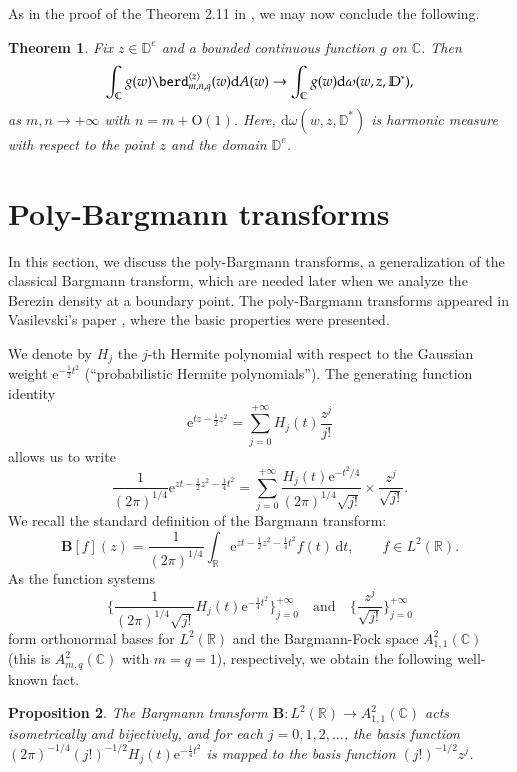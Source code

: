 \documentclass{birkart}
\newtheorem{thm}{Theorem}[section]
\newtheorem{prop}[thm]{Proposition}
\theoremstyle{definition}
\theoremstyle{remark}
\numberwithin{equation}{section}
\numberwithin{figure}{section}
\newcommand{\e}{\mathrm e}
\newcommand{\1}{{\mathbf 1}}
\newcommand{\Rpar}{q}
\newcommand{\C}{{\mathbb C}}
\newcommand{\D}{{\mathbb D}}
\newcommand{\R}{{\mathbb R}}
\newcommand{\Ordo}{\mathrm{O}}
\newcommand{\Bop}{{\mathbf B}}
\newcommand{\diff}{{\mathrm d}}
\begin{document}
As in the proof of the Theorem 2.11 in \cite{ahm1}, we may now conclude
the following. 
  
\begin{thm}
Fix $z\in\D^e$ and a bounded continuous function $g$ on $\mathbb{C}$. Then 
\[ 
\int_{\C}g(w)\berd^{\langle z\rangle}_{m,n,\Rpar}(w)\diff A(w)\to\int_{\C}g(w)
\diff\omega(w,z, \mathbb{D}^*) , 
\] 
as $m,n \to+\infty$ with $n=m+\Ordo(1)$. Here, 
$ \diff\omega(w,z, \mathbb{D}^*) $ is harmonic measure with respect to the 
point $z$ and the domain $\D^e$.
\end{thm}


\section{Poly-Bargmann transforms}

In this section, we discuss the poly-Bargmann transforms, a generalization of
the classical Bargmann transform, which are needed later when we analyze 
the Berezin density at a boundary point. The poly-Bargmann transforms appeared
in Vasilevski's paper \cite{vas}, where the basic properties were presented. 
\medskip

We denote by $H_j$ the $j$-th Hermite polynomial with respect to the Gaussian 
weight $\e^{-\frac12t^2}$ (``probabilistic Hermite polynomials''). The 
generating function identity
\[ 
\e^{tz-\frac12z^2} = \sum_{j=0}^{+\infty} H_j(t)\frac{z^j}{j!}
\]
allows us to write
\[
\frac{1}{(2\pi)^{1/4}}\e^{zt-\frac12z^2-\frac14t^2}=  
\sum_{j=0}^{+\infty} \frac{H_j(t)\e^{-t^2/4}}{(2\pi)^{1/4}\sqrt{j!}}
\times\frac{z^j}{\sqrt{j!}}.
\]
We recall the standard definition of the Bargmann transform:
\[
\Bop[f](z)= \frac{1}{(2 \pi)^{1/4}} \int_{\R}
 \e^{zt-\frac12z^2-\frac14t^2}f(t)\,\diff t, \qquad
f \in L^2(\R). 
\]
As the function systems 
\[
\Big\{\frac{1}{(2\pi)^{1/4}\sqrt{j!}}H_j(t)\e^{-\frac14t^2} 
\Big\}_{j=0}^{+\infty}\quad\text{and}\quad \Big\{\frac{z^j}{\sqrt{j!}}
\Big\}_{j=0}^{+\infty}
\] 
form orthonormal bases for $L^2(\mathbb{R})$ and the Bargmann-Fock space 
$A^2_{1,1}(\C)$ (this is $A^2_{m,q}(\C)$ with $m=q=1$), respectively,  
we obtain the following well-known fact.
 
\begin{prop}
The Bargmann transform $\Bop:L^2(\R)\to A_{1,1}^2(\C)$ acts isometrically and
bijectively, and for each $j=0,1,2,\ldots$, the basis function
$(2\pi)^{-1/4}(j!)^{-1/2}H_j(t)\e^{-\frac14t^2}$ is mapped to the basis 
function $(j!)^{-1/2}z^j$. 
\end{prop}
\medskip
\end{document}
